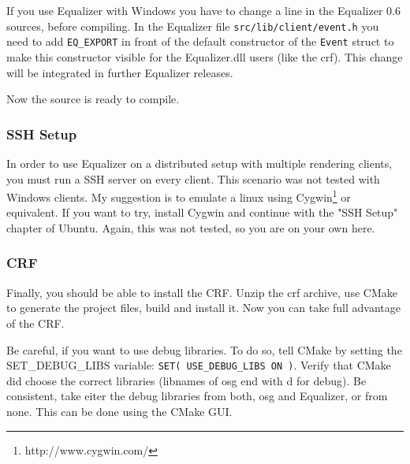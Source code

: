 If you use Equalizer with Windows you have to change a line in the Equalizer 0.6 sources, before compiling. In the Equalizer file   \texttt{src/lib/client/event.h} you need to add \texttt{EQ\_EXPORT} in front of the default constructor of the \texttt{Event} struct to make this constructor visible for the Equalizer.dll users (like the \gls{crf}). This change will be integrated in further Equalizer releases. 

Now the source is ready to compile.


\subsubsection{SSH Setup}

In order to use Equalizer on a distributed setup with multiple rendering clients, you must run a SSH server on every client. This scenario was not tested with Windows clients. My suggestion is to emulate a linux using Cygwin\footnote{http://www.cygwin.com/} or equivalent. If you want to try, install Cygwin and continue with the "SSH Setup" chapter of Ubuntu. Again, this was not tested, so you are on your own here.

\subsubsection{CRF}

Finally, you should be able to install the CRF. Unzip the crf archive, use CMake to generate the project files, build and install it. Now you can take full advantage of the CRF. 

Be careful, if you want to use debug libraries. To do so, tell CMake by setting the SET\_DEBUG\_LIBS variable: \texttt{SET( USE\_DEBUG\_LIBS ON )}. Verify that CMake did choose the correct libraries (libnames of \gls{osg} end with d for debug). Be consistent, take eiter the debug libraries from both, \gls{osg} and Equalizer, or from none. This can be done using the CMake GUI.
